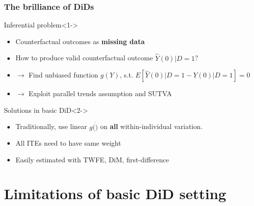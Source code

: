 \documentclass[12pt,aspectratio=169]{beamer}\usepackage[]{graphicx}\usepackage[]{xcolor}
\begin{document}
\begin{frame}
\frametitle{The brilliance of DiDs}

    \begin{alertblock}{Inferential problem}<1->
    \small

    \begin{itemize}[itemsep=0em, topsep=0pt]
        \item Counterfactual outcomes as \textbf{missing data}
        \item How to produce valid counterfactual outcome $\hat{Y}(0)| D = 1$?
        \item $\rightarrow$ Find unbiased function $g(Y)$, s.t.  $E[ \hat{Y}(0)| D = 1 -  Y(0)| D = 1] = 0$
        \item $\rightarrow$ Exploit parallel trends assumption and SUTVA
    \end{itemize}

    \end{alertblock}

    \begin{alertblock}{Solutions in basic DiD}<2->
    \small

    \begin{itemize}[itemsep=0em, topsep=0pt]
        \item Traditionally, use linear $g(\dot)$ on \textbf{all} within-individual variation.
        \item All ITEs need to have same weight
        \item Easily estimated with TWFE, DiM, first-difference
    \end{itemize}

    \end{alertblock}

\end{frame}


\section{Limitations of basic DiD setting }
\end{document}
